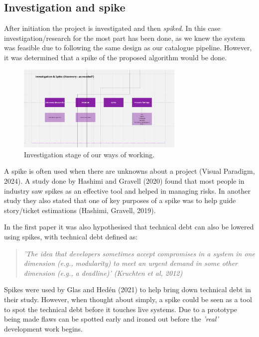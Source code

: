 \subsection{Investigation and spike}
  After initiation the project is investigated and then \textit{spiked}. In this case investigation/research for the most part has been done,
  as we knew the system was feasible due to following the same design as our catalogue pipeline. However, it was determined that a spike of the 
  proposed algorithm would be done.

  \begin{figure}[H]
    \centering
    \includegraphics[width=8cm]{assets/workflow/investigation.png}
    \caption{Investigation stage of our ways of working.}
    \label{fig:workflowInvestigation}
  \end{figure}

  A spike is often used when there are unknowns about a  project (Visual Paradigm, 2024). A study done by 
  Hashimi and Gravell (2020) found that most people in industry saw spikes as an effective tool and helped in managing risks. In another
  study they also stated that one of key purposes of a spike was to help guide story/ticket estimations (Hashimi, Gravell, 2019). 

  In the first paper it was also hypothesised that technical debt can also be lowered using spikes, with technical debt defined as:
  \begin{quote}
    \textit{'The idea that developers sometimes accept
    compromises in a system in one dimension (e.g., modularity) to meet an
    urgent demand in some other dimension (e.g., a deadline)' (Kruchten et al, 2012)}
  \end{quote}

  Spikes were used by Glas and Hedén (2021) to help bring down technical debt in their study. However, when thought about simply, 
  a spike could be seen as a tool to spot the technical debt before it touches live systems. Due to a prototype being made flaws can be spotted 
  early and ironed out before the \textit{'real'} development work begins.

